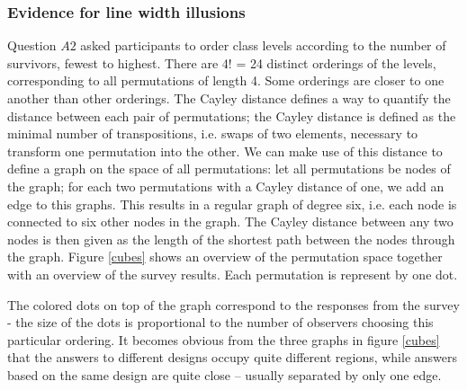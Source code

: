 


\subsubsection{Evidence for line width illusions}

Question $A2$ asked participants to order  class levels  according to the number of survivors, fewest to highest. There are 4! = 24 distinct orderings of the levels, corresponding to all permutations of length 4. Some orderings are closer to one another than other orderings. The Cayley distance defines a way to quantify the distance between  each pair of permutations; the Cayley distance is defined as the minimal number of transpositions, i.e. swaps of two elements,  necessary to transform one permutation into the other.
We can make use of this distance to define a graph on the space of all permutations: let all permutations be nodes of the graph; for each two permutations with a Cayley distance of one, we add an edge to this graphs. This results in a regular graph of degree six, i.e. each  node is connected to six other nodes in the graph. The Cayley distance between any two nodes is then given as the length of the shortest path between the nodes through the graph.
Figure \ref{cubes} shows an overview of the permutation space together with an overview of the survey results. Each permutation is represent by one dot. 

The colored dots on top of the graph correspond to the responses from the survey - the size of the dots is proportional to the number of observers choosing this particular ordering. It becomes obvious from the three graphs in figure \ref{cubes} that
the answers to different designs occupy quite different regions, while answers based  on the same design are quite close --  usually separated by only one edge. 

